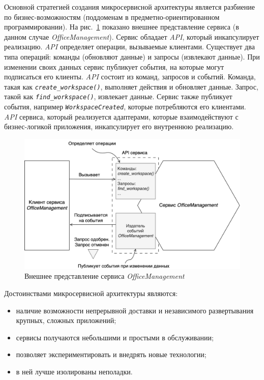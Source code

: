 Основной стратегией создания микросервисной архитектуры является разбиение по бизнес-возможностям (поддоменам в предметно-ориен\-ти\-ро\-ван\-ном программировании). На рис.~\ref{fig:microservices-service-illustration} показано внешнее представление сервиса (в данном случае \textit{OfficeManagement}). Сервис обладает \textit{API}, который инкапсулирует реализацию. \textit{API} определяет операции, вызываемые клиентами. Существует два типа операций: команды (обновляют данные) и запросы (извлекают данные). При изменении своих данных сервис публикует события, на которые могут подписаться его клиенты. \textit{API} состоит из команд, запросов и событий. Команда, такая как \textit{\lstinline!create_workspace()!}, выполняет действия и обновляет данные. Запрос, такой как \textit{\lstinline!find_workspace()!}, извлекает данные. Сервис также публикует события, например
\textit{\lstinline!WorkspaceCreated!}, которые потребляются его клиентами. \textit{API} сервиса, который реализуется адаптерами, которые взаимодействуют с бизнес-логикой приложения, инкапсулирует его внутреннюю реализацию.

\begin{figure}[h]
\centering
    \includegraphics[width=0.9\linewidth]{assets/microservices-service-illustration.png}
    \caption{Внешнее представление сервиса \textit{OfficeManagement}}
    \label{fig:microservices-service-illustration}
\end{figure}

Достоинствами микросервисной архитектуры являются:

\begin{itemize}
    \item наличие возможности непрерывной доставки и независимого развертывания крупных, сложных приложений;
    \item сервисы получаются небольшими и простыми в обслуживании;
    \item позволяет экспериментировать и внедрять новые технологии;
    \item в ней лучше изолированы неполадки.
\end{itemize}

